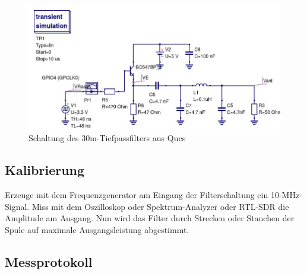 
\begin{figure}[H]
    \centering
    \includegraphics[width=1\textwidth]{Messtechnik/Bilder/30mRaspiAmpLP.jpg}
    \caption{Schaltung des 30m-Tiefpassfilters aus Qucs}
    \label{fig:30mLP}
\end{figure}

\subsection*{Kalibrierung}

Erzeuge mit dem Frequenzgenerator am Eingang der Filterschaltung ein
10-MHz-Signal. Miss mit dem Oszilloskop oder Spektrum-Analyzer oder RTL-SDR die
Amplitude am Ausgang. Nun wird das Filter durch Strecken oder Stauchen der Spule
auf maximale Ausgangsleistung abgestimmt.

\subsection*{Messprotokoll}


